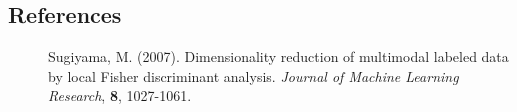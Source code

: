 \documentclass[12pt]{article}
\begin{document}
%        
%
%        

\subsection*{References}
\begin{description}
\item[] Sugiyama, M. (2007).
Dimensionality reduction of multimodal labeled data by local Fisher discriminant analysis. \textit{Journal of Machine Learning Research}, \textbf{8}, 1027-1061.
		   
\iffalse
\item
Hastie, T. and Buja, A. and Tibshirani, R. (1995) Penalized discriminant analysis.\texttit{The Annals of Statistics}, 73-102.

\item
Hotelling, H. (1936). Relations between two sets of variates. \textit{Biometrika}, \textbf{28}, 321-377.
\fi
\end{description}
\end{document}
